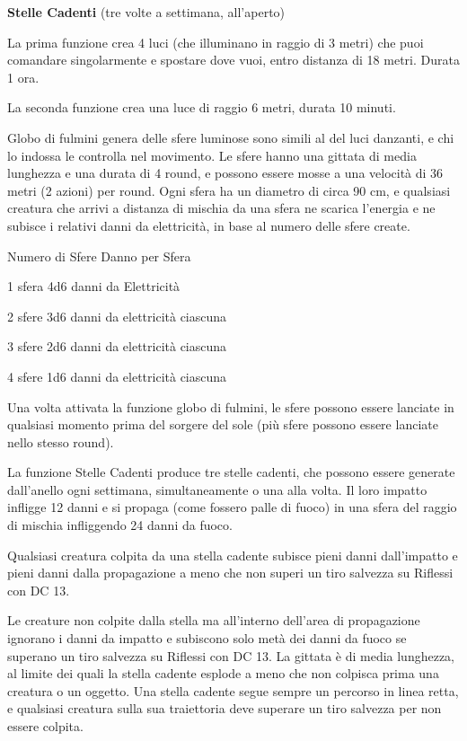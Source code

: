 \documentclass[a4paper,11pt,twoside,openany]{book}
\begin{document}
\textbf{Stelle Cadenti} (tre volte a settimana, all'aperto)

La prima funzione crea 4 luci (che illuminano in raggio di 3 metri) che puoi comandare singolarmente e spostare dove vuoi, entro distanza di 18 metri. Durata 1 ora.

La seconda funzione crea una luce di raggio 6 metri, durata 10 minuti.

Globo di fulmini genera delle sfere luminose sono simili al del luci danzanti, e chi lo indossa le controlla nel movimento. Le sfere hanno una gittata di media lunghezza e una durata di 4 round, e possono essere mosse a una velocità di 36 metri (2 azioni) per round. Ogni sfera ha un diametro di circa 90 cm, e qualsiasi creatura che arrivi a distanza di mischia da una sfera ne scarica l'energia e ne subisce i relativi danni da elettricità, in base al numero delle sfere create.

Numero di Sfere Danno per Sfera

1 sfera 4d6 danni da Elettricità

2 sfere 3d6 danni da elettricità ciascuna

3 sfere 2d6 danni da elettricità ciascuna

4 sfere 1d6 danni da elettricità ciascuna

Una volta attivata la funzione globo di fulmini, le sfere possono essere lanciate in qualsiasi momento prima del sorgere del sole (più sfere possono essere lanciate nello stesso round).

La funzione Stelle Cadenti produce tre stelle cadenti, che possono essere generate dall'anello ogni settimana, simultaneamente o una alla volta. Il loro impatto infligge 12 danni e si propaga (come fossero palle di fuoco) in una sfera del raggio di mischia infliggendo 24 danni da fuoco.

Qualsiasi creatura colpita da una stella cadente subisce pieni danni dall'impatto e pieni danni dalla propagazione a meno che non superi un tiro salvezza su Riflessi con DC 13.

Le creature non colpite dalla stella ma all'interno dell'area di propagazione ignorano i danni da impatto e subiscono solo metà dei danni da fuoco se superano un tiro salvezza su Riflessi con DC 13. La gittata è di media lunghezza, al limite dei quali la stella cadente esplode a meno che non colpisca prima una creatura o un oggetto. Una stella cadente segue sempre un percorso in linea retta, e qualsiasi creatura sulla sua traiettoria deve superare un tiro salvezza per non essere colpita.
\end{document}

